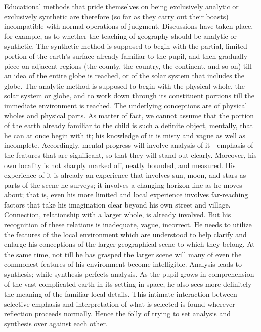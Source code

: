 \documentclass[showtrims,ustradepaper]{memoir}
\begin{document}

Educational methods that pride themselves on being exclusively analytic
or exclusively synthetic are therefore (so far as they carry out their
boasts) incompatible with normal operations of judgment. Discussions
have taken place, for example, as to whether the teaching of geography
should be analytic or synthetic. The synthetic method is supposed to
begin with the partial, limited portion of the earth's surface already
familiar to the pupil, and then gradually piece on adjacent regions (the
county, the country, the continent, and so on) till an idea of the
entire globe is reached, or of the solar system that includes the globe.
The analytic method is supposed to begin with the physical whole, the
solar system or globe, and to work down through its constituent portions
till the immediate environment is reached. The underlying conceptions
are of physical wholes and
physical
parts. As matter of fact, we cannot assume that the portion of the earth
already familiar to the child is such a definite object, mentally, that
he can at once begin with it; his knowledge of it is misty and vague as
well as incomplete. Accordingly, mental progress will involve analysis
of it---emphasis of the features that are significant, so that they will
stand out clearly. Moreover, his own locality is not sharply marked off,
neatly bounded, and measured. His experience of it is already an
experience that involves sun, moon, and stars as parts of the scene he
surveys; it involves a changing horizon line as he moves about; that is,
even his more limited and local experience involves far-reaching factors
that take his imagination clear beyond his own street and village.
Connection, relationship with a larger whole, is already involved. But
his recognition of these relations is inadequate, vague, incorrect. He
needs to utilize the features of the local environment which are
understood to help clarify and enlarge his conceptions of the larger
geographical scene to which they belong. At the same time, not till he
has grasped the larger scene will many of even the commonest features of
his environment become intelligible. Analysis leads to synthesis; while
synthesis perfects analysis. As the pupil grows in comprehension of the
vast complicated earth in its setting in space, he also sees more
definitely the meaning of the familiar local details. This intimate
interaction between selective emphasis and interpretation of what is
selected is found wherever reflection proceeds normally. Hence the folly
of trying to set analysis and synthesis over against each
other.
\end{document}
